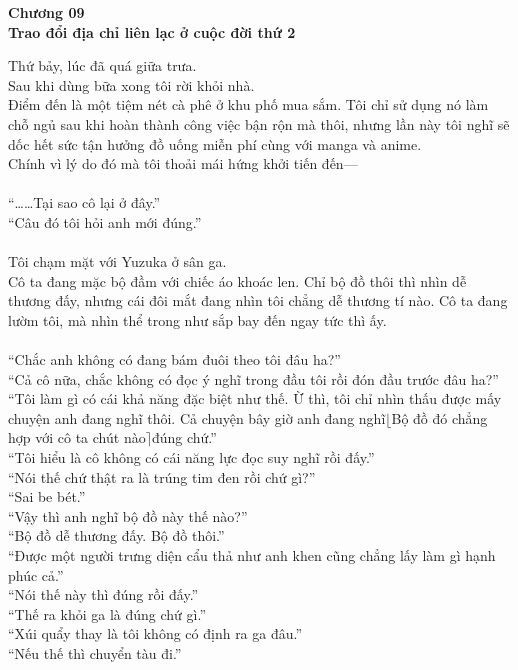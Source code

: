 \documentclass[12pt,a4paper, twosides]{book}
\begin{document}
    \begin{center}
    \textbf{\large Chương 09 \\ Trao đổi địa chỉ liên lạc ở cuộc đời thứ 2}
    \end{center}
    \noindent
Thứ bảy, lúc đã quá giữa trưa.\\
Sau khi dùng bữa xong tôi rời khỏi nhà.\\
Điểm đến là một tiệm nét cà phê ở khu phố mua sắm. Tôi chỉ sử dụng nó làm chỗ ngủ sau khi hoàn thành công việc bận rộn mà thôi, nhưng lần này tôi nghĩ sẽ dốc hết sức tận hưởng đồ uống miễn phí cùng với manga và anime.\\
Chính vì lý do đó mà tôi thoải mái hứng khởi tiến đến—\\
\\
“……Tại sao cô lại ở đây.”\\
“Câu đó tôi hỏi anh mới đúng.”\\
\\
Tôi chạm mặt với Yuzuka ở sân ga.\\
Cô ta đang mặc bộ đầm với chiếc áo khoác len. Chỉ bộ đồ thôi thì nhìn dễ thương đấy, nhưng cái đôi mắt đang nhìn tôi chẳng dễ thương tí nào. Cô ta đang lườm tôi, mà nhìn thể trong như sắp bay đến ngay tức thì ấy.\\
\\
“Chắc anh không có đang bám đuôi theo tôi đâu ha?”\\
“Cả cô nữa, chắc không có đọc ý nghĩ trong đầu tôi rồi đón đầu trước đâu ha?”\\
“Tôi làm gì có cái khả năng đặc biệt như thế. Ừ thì, tôi chỉ nhìn thấu được mấy chuyện anh đang nghĩ thôi. Cả chuyện bây giờ anh đang nghĩ$\lfloor$Bộ đồ đó chẳng hợp với cô ta chút nào$\rceil$đúng chứ.”\\
“Tôi hiểu là cô không có cái năng lực đọc suy nghĩ rồi đấy.”\\
“Nói thế chứ thật ra là trúng tim đen rồi chứ gì?”\\
“Sai be bét.”\\
“Vậy thì anh nghĩ bộ đồ này thế nào?”\\
“Bộ đồ dễ thương đấy. Bộ đồ thôi.”\\
“Được một người trưng diện cẩu thả như anh khen cũng chẳng lấy làm gì hạnh phúc cả.”\\
“Nói thế này thì đúng rồi đấy.”\\
“Thế ra khỏi ga là đúng chứ gì.”\\
“Xúi quẩy thay là tôi không có định ra ga đâu.”\\
“Nếu thế thì chuyển tàu đi.”\\
\end{document}
